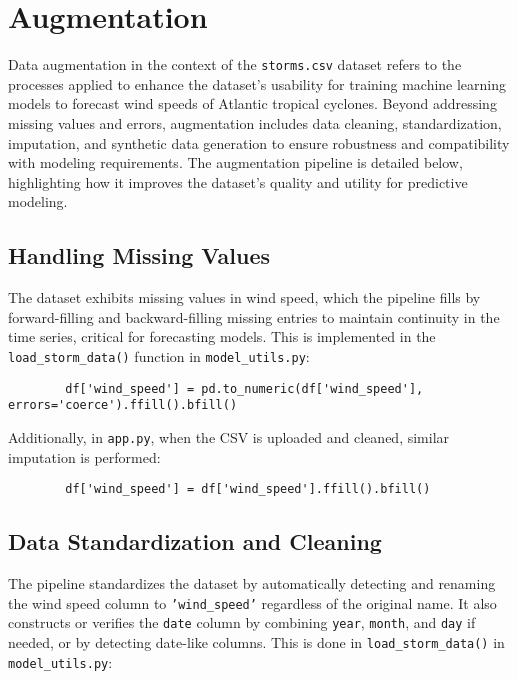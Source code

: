 \section{Augmentation}

Data augmentation in the context of the \texttt{storms.csv} dataset refers to the processes applied to enhance the dataset’s usability for training machine learning models to forecast wind speeds of Atlantic tropical cyclones. Beyond addressing missing values and errors, augmentation includes data cleaning, standardization, imputation, and synthetic data generation to ensure robustness and compatibility with modeling requirements. The augmentation pipeline is detailed below, highlighting how it improves the dataset’s quality and utility for predictive modeling.

\subsection{Handling Missing Values}

The dataset exhibits missing values in wind speed, which the pipeline fills by forward-filling and backward-filling missing entries to maintain continuity in the time series, critical for forecasting models. This is implemented in the \texttt{load\_storm\_data()} function in \texttt{model\_utils.py}:

\begin{framed}
	\begin{lstlisting}
		df['wind_speed'] = pd.to_numeric(df['wind_speed'], errors='coerce').ffill().bfill()
	\end{lstlisting}
\end{framed}


Additionally, in \texttt{app.py}, when the CSV is uploaded and cleaned, similar imputation is performed:

\begin{framed}
	\begin{verbatim}
		df['wind_speed'] = df['wind_speed'].ffill().bfill()
	\end{verbatim}
\end{framed}




\subsection{Data Standardization and Cleaning}

The pipeline standardizes the dataset by automatically detecting and renaming the wind speed column to \texttt{'wind\_speed'} regardless of the original name. It also constructs or verifies the \texttt{date} column by combining \texttt{year}, \texttt{month}, and \texttt{day} if needed, or by detecting date-like columns. This is done in \texttt{load\_storm\_data()} in \texttt{model\_utils.py}:


